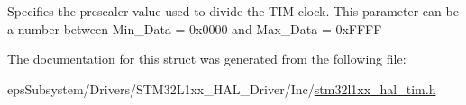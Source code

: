 Specifies the prescaler value used to divide the T\-I\-M clock. This parameter can be a number between Min\-\_\-\-Data = 0x0000 and Max\-\_\-\-Data = 0x\-F\-F\-F\-F 

The documentation for this struct was generated from the following file\-:\begin{DoxyCompactItemize}
\item 
eps\-Subsystem/\-Drivers/\-S\-T\-M32\-L1xx\-\_\-\-H\-A\-L\-\_\-\-Driver/\-Inc/\hyperlink{stm32l1xx__hal__tim_8h}{stm32l1xx\-\_\-hal\-\_\-tim.\-h}\end{DoxyCompactItemize}
